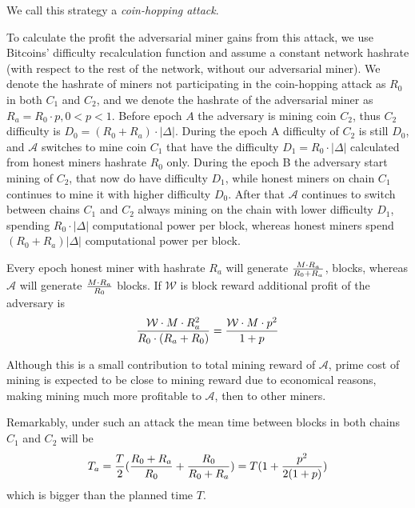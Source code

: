 \documentclass[]{llncs}
\newcommand{\texp}{|\Delta|}
\newcommand{\reward}{\mathcal{W}}
\newcommand{\attackname}{coin-hopping attack}
\newcommand{\coinA}{$C_1$}
\newcommand{\coinB}{$C_2$}
\begin{document}
We call this strategy a \textit{\attackname}.

To calculate the profit the adversarial miner gains from this attack, we use Bitcoins' difficulty recalculation function and assume a  constant network hashrate (with respect to the rest of the network, without our adversarial miner).
We denote the hashrate of miners not participating in the coin-hopping attack as $R_0$ in both \coinA{} and \coinB{}, and we denote the hashrate of the adversarial miner as $R_a=R_0\cdot p, 0 < p < 1 $.
Before epoch $A$ the adversary is mining coin \coinB{}, thus \coinB{} difficulty is $D_0 = (R_0+R_a) \cdot \texp$.
During the epoch A difficulty of \coinB{} is still $D_0$, and $\mathcal{A}$ switches to mine coin \coinA{} that have the difficulty $D_1 = R_0 \cdot \texp$  calculated from honest miners hashrate $R_0$ only.
During the epoch B the adversary start mining of \coinB{}, that now do have difficulty $D_1$, while honest miners on chain \coinA{} continues to mine it with higher difficulty $D_0$.
After that $\mathcal{A}$ continues to switch between chains \coinA{} and \coinB{} always mining on the chain with lower difficulty $D_1$, spending $R_0 \cdot \texp$ computational power per block, whereas honest miners spend $(R_0+R_a) \texp$ computational power per block.

Every epoch honest miner with hashrate $R_a$ will generate $M \cdot R_a \over R_0 + R_a$, blocks, whereas $\mathcal{A}$ will generate $M \cdot R_a \over R_0$ blocks.
If $\reward$ is block reward additional profit of the adversary is
\begin{equation}
{\reward \cdot M \cdot R_a^2 \over R_0 \cdot (R_a + R_0)} = {\reward \cdot M \cdot p^2 \over 1+p}
\end{equation}

Although this is a small contribution to total mining reward of $\mathcal{A}$, prime cost of mining is expected to be close to mining reward due to economical reasons, making mining much more profitable to $\mathcal{A}$, then to other miners.

Remarkably, under such an attack the mean time between blocks in both chains \coinA{} and \coinB{} will be
\begin{equation}
\label{eq:ati}
{T_a={T\over 2}({R_0+R_a\over R_0} + {R_0 \over R_0+R_a}) = T(1 + {p^2\over 2(1+p)})}
\end{equation}
which is bigger than the planned time $T$.

\end{document}
